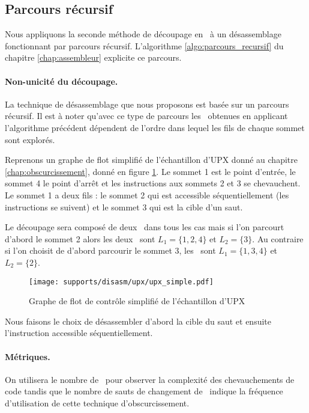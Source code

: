 \subsection{Parcours récursif\label{sec:layers_decoupage_recursif}}
Nous appliquons la seconde méthode de découpage en \layers\ à un désassemblage fonctionnant par parcours récursif. L'algorithme \ref{algo:parcours_recursif} du chapitre \ref{chap:assembleur} explicite ce parcours.

\paragraph{Non-unicité du découpage.}
La technique de désassemblage que nous proposons est basée sur un parcours récursif. Il est à noter qu'avec ce type de parcours les \layers\ obtenues en applicant l'algorithme précédent dépendent de l'ordre dans lequel les fils de chaque sommet sont explorés.

Reprenons un graphe de flot simplifié de l'échantillon d'UPX donné au chapitre \ref{chap:obscurcissement}, donné en figure \ref{fig:upx_cfg_simple}. Le sommet 1 est le point d'entrée, le sommet 4 le point d'arrêt et les instructions aux sommets 2 et 3 se chevauchent. Le sommet 1 a deux fils : le sommet 2 qui est accessible séquentiellement (les instructions se suivent) et le sommet 3 qui est la cible d'un saut.

Le découpage sera composé de deux \layers\ dans tous les cas mais si l'on parcourt d'abord le sommet 2 alors les deux \layers\ sont $L_1=\{1, 2, 4\}$ et $L_2=\{3\}$. Au contraire si l'on choisit de d'abord parcourir le sommet 3, les \layers\ sont $L_1=\{1, 3, 4\}$ et $L_2=\{2\}$.

\begin{figure}[h]
\begin{center}
\texttt{[image: supports/disasm/upx/upx\_simple.pdf]}
\end{center}
\caption{Graphe de flot de contrôle simplifié de l'échantillon d'UPX}
\label{fig:upx_cfg_simple}
\end{figure}

Nous faisons le choix de désassembler d'abord la cible du saut et ensuite l'instruction accessible séquentiellement.

\paragraph{Métriques.}
On utilisera le nombre de \layers\ pour observer la complexité des chevauchements de code tandis que le nombre de sauts de changement de \layers\ indique la fréquence d'utilisation de cette technique d'obscurcissement.


